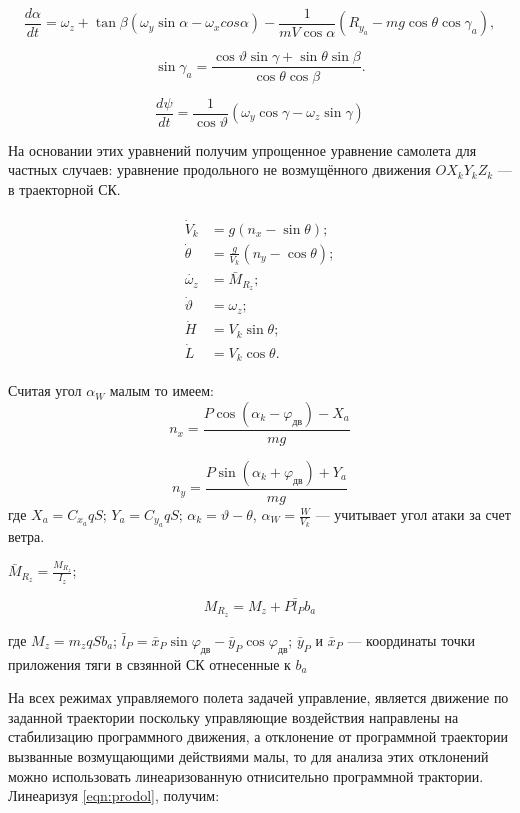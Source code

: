 \documentclass{article}
\begin{document}
\[
	\frac{d\alpha}{dt} = \omega_z + \tan{\beta}(\omega_y \sin{\alpha} - \omega_x cos{\alpha}) - \frac{1}{mV \cos{\alpha}} (R_{y_a} - mg\cos{\theta} \cos{\gamma_a}),
\]

\[
	\sin{\gamma_a} = \frac{\cos{\vartheta} \sin{\gamma} + \sin{\theta} \sin{\beta}}{\cos{\theta} \cos{\beta}}.
\]

\[
	\frac{d\psi}{dt} = \frac{1}{\cos{\vartheta}}(\omega_y \cos{\gamma} - \omega_z \sin{\gamma})
\]

На основании этих уравнений получим упрощенное уравнение самолета для частных случаев:
уравнение продольного не возмущённого движения $OX_k Y_k Z_k$ --- в траекторной СК.

\begin{align}
	\label{eqn:prodol}
	\begin{split}
		\dot{V}_k&= g(n_x - \sin{\theta});
		\\
		\dot{\theta}&= \frac{g}{V_k} (n_y - \cos{\theta});
		\\
		\dot{\omega_z}&= \bar{M}_{R_z};
		\\
		\dot{\vartheta}&= \omega_{z};
		\\
		\dot{H}&= V_k \sin{\theta};
		\\
		\dot{L}&= V_k \cos{\theta}.
	\end{split}
\end{align}

Считая угол $\alpha_W$ малым то имеем:
\[
	n_x = \frac{P\cos{(\alpha_k - \varphi_\text{дв})} - X_a}{mg}
\]

\[
	n_y = \frac{P \sin{(\alpha_k + \varphi_\text{дв})} + Y_a}{mg}
\]
где $X_a = C_{x_a} q S$; $Y_a = C_{y_a} q S$; $\alpha_k = \vartheta - \theta$, 
$\alpha_W = \frac{W}{V_k}$ --- учитывает угол атаки за счет ветра.

$\bar{M}_{R_z} = \frac{M_{R_z}}{I_z}$; 

\[
	M_{R_z} = M_z + P \bar{l}_P b_a
\]

где $M_z = m_z q S b_a$; $\bar{l}_P = \bar{x}_P \sin{\varphi_\text{дв}} - \bar{y}_P \cos{\varphi_\text{дв}}$; $\bar{y}_P$ и $\bar{x}_P$ --- координаты точки приложения тяги в свзянной СК отнесенные к $b_a$

На всех режимах управляемого полета задачей управление, является движение по заданной траектории поскольку управляющие воздействия направлены на стабилизацию программного движения, а отклонение от программной траектории вызванные возмущающими действиями малы, то для анализа этих отклонений можно использовать линеаризованную отнисительно программной трактории. Линеаризуя \eqref{eqn:prodol}, получим: 
\end{document}
